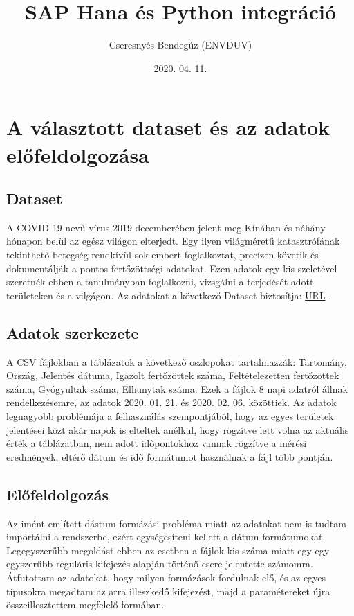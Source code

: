 \documentclass[12pt,a4papaer]{article}
\title{SAP Hana és Python integráció}
\date{2020. 04. 11.}
\author{Cseresnyés Bendegúz (ENVDUV)}
\begin{document}
    \maketitle
    \tableofcontents

    \newpage
    \section{A választott dataset és az adatok előfeldolgozása}
    \subsection{Dataset}
    A COVID-19 nevű vírus 2019 decemberében jelent meg Kínában és néhány hónapon belül az egész világon elterjedt.
    Egy ilyen világméretű katasztrófának tekinthető betegség rendkívül sok embert foglalkoztat, precízen követik és dokumentálják a pontos fertőzöttségi adatokat.
    Ezen adatok egy kis szeletével szeretnék ebben a tanulmányban foglalkozni, vizsgálni a terjedését adott területeken és a vilgágon.
    Az adatokat a következő Dataset biztosítja: \hyperref[dataset_link]{URL} .

    \subsection{Adatok szerkezete}
    A CSV fájlokban a táblázatok a következő oszlopokat tartalmazzák: Tartomány, Ország, Jelentés dátuma, Igazolt fertőzöttek száma, Feltételezetten fertőzöttek száma, Gyógyultak száma, Elhunytak száma.
    Ezek a fájlok 8 napi adatról állnak rendelkezésemre, az adatok 2020. 01. 21. és 2020. 02. 06. közöttiek.
    Az adatok legnagyobb problémája a felhasználás szempontjából, hogy az egyes területek jelentései közt akár napok is elteltek anélkül, hogy rögzítve lett volna az aktuális érték a táblázatban, 
    nem adott időpontokhoz vannak rögzítve a mérési eredmények, eltérő dátum és idő formátumot használnak a fájl több pontján.
    \subsection{Előfeldolgozás}
    Az imént említett dástum formázási probléma miatt az adatokat nem is tudtam importálni a rendszerbe, ezért egységesíteni kellett a dátum formátumokat.
    Legegyszerűbb megoldást ebben az esetben a fájlok kis száma miatt egy-egy egyszerűbb reguláris kifejezés alapján történő csere jelentette számomra.
    Átfutottam az adatokat, hogy milyen formázások fordulnak elő, és az egyes típusokra megadtam az arra illeszkedő kifejezést, majd a paramétereket újra összeillesztettem megfelelő formában.
\end{document}
